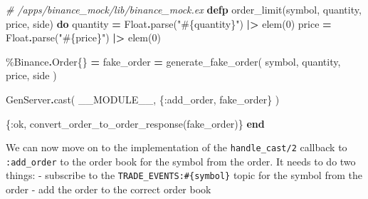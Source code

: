 \documentclass[
]{book}
\newenvironment{Shaded}{\begin{snugshade}}{\end{snugshade}}
\newcommand{\CommentTok}[1]{\textcolor[rgb]{0.56,0.35,0.01}{\textit{#1}}}
\newcommand{\ConstantTok}[1]{\textcolor[rgb]{0.00,0.00,0.00}{#1}}
\newcommand{\DecValTok}[1]{\textcolor[rgb]{0.00,0.00,0.81}{#1}}
\newcommand{\KeywordTok}[1]{\textcolor[rgb]{0.13,0.29,0.53}{\textbf{#1}}}
\newcommand{\NormalTok}[1]{#1}
\newcommand{\OperatorTok}[1]{\textcolor[rgb]{0.81,0.36,0.00}{\textbf{#1}}}
\newcommand{\OtherTok}[1]{\textcolor[rgb]{0.56,0.35,0.01}{#1}}
\newcommand{\StringTok}[1]{\textcolor[rgb]{0.31,0.60,0.02}{#1}}
\newcommand{\VariableTok}[1]{\textcolor[rgb]{0.00,0.00,0.00}{#1}}
\begin{document}
\begin{Shaded}
\begin{Highlighting}[]
\CommentTok{\# /apps/binance\_mock/lib/binance\_mock.ex}
  \KeywordTok{defp}\NormalTok{ order\_limit(symbol, quantity, price, side) }\KeywordTok{do}
\NormalTok{    quantity }\OperatorTok{=} \ConstantTok{Float}\OperatorTok{.}\NormalTok{parse(}\StringTok{"}\OtherTok{\#\{}\NormalTok{quantity}\OtherTok{\}}\StringTok{"}\NormalTok{) }\OperatorTok{|\textgreater{}}\NormalTok{ elem(}\DecValTok{0}\NormalTok{)}
\NormalTok{    price }\OperatorTok{=} \ConstantTok{Float}\OperatorTok{.}\NormalTok{parse(}\StringTok{"}\OtherTok{\#\{}\NormalTok{price}\OtherTok{\}}\StringTok{"}\NormalTok{) }\OperatorTok{|\textgreater{}}\NormalTok{ elem(}\DecValTok{0}\NormalTok{)}

\NormalTok{    \%}\ConstantTok{Binance}\OperatorTok{.}\ConstantTok{Order}\NormalTok{\{\} }\OperatorTok{=}
\NormalTok{      fake\_order }\OperatorTok{=}
\NormalTok{      generate\_fake\_order(}
\NormalTok{        symbol,}
\NormalTok{        quantity,}
\NormalTok{        price,}
\NormalTok{        side}
\NormalTok{      )}

    \ConstantTok{GenServer}\OperatorTok{.}\NormalTok{cast(}
      \ConstantTok{\_\_MODULE\_\_}\NormalTok{,}
\NormalTok{      \{}\VariableTok{:add\_order}\NormalTok{, fake\_order\}}
\NormalTok{    )}

\NormalTok{    \{}\VariableTok{:ok}\NormalTok{, convert\_order\_to\_order\_response(fake\_order)\}}
  \KeywordTok{end}
\end{Highlighting}
\end{Shaded}

We can now move on to the implementation of the \texttt{handle\_cast/2} callback to \texttt{:add\_order} to the order book for the symbol from the order.
It needs to do two things:
- subscribe to the \texttt{TRADE\_EVENTS:\#\{symbol\}} topic for the symbol from
the order
- add the order to the correct order book
\end{document}
